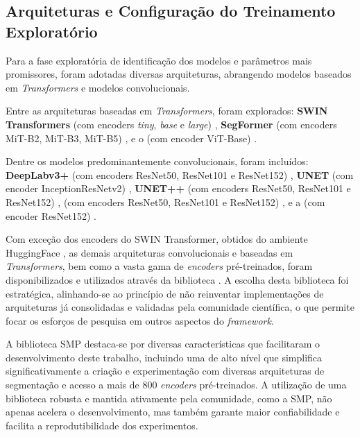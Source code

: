 \subsection{Arquiteturas e Configuração do Treinamento Exploratório}\label{subsec:met_arq_treino_exp}
Para a fase exploratória de identificação dos modelos e parâmetros mais promissores, foram adotadas diversas arquiteturas, abrangendo modelos baseados em \textit{Transformers} e modelos convolucionais.

Entre as arquiteturas baseadas em \textit{Transformers}, foram explorados: \textbf{SWIN Transformers} (com encoders \textit{tiny}, \textit{base} e \textit{large}) \cite{Liu2021}, \textbf{SegFormer} (com encoders MiT-B2, MiT-B3, MiT-B5) \cite{Xie2021}, e o \textbf{} (com encoder ViT-Base) \cite{Ranftl2021}.

Dentre os modelos predominantemente convolucionais, foram incluídos: \textbf{DeepLabv3+} (com encoders ResNet50, ResNet101 e ResNet152) \cite{Chen2018}, \textbf{UNET} (com encoder InceptionResNetv2) \cite{Ronneberger2015, Szegedy2017}, \textbf{UNET++} (com encoders ResNet50, ResNet101 e ResNet152) \cite{Zhou2018}, \textbf{} (com encoders ResNet50, ResNet101 e ResNet152) \cite{Lin2017}, e a \textbf{} (com encoder ResNet152) \cite{Fan2020}.

Com exceção dos encoders do SWIN Transformer, obtidos do ambiente HuggingFace \cite{HuggingFace}, as demais arquiteturas convolucionais e baseadas em \textit{Transformers}, bem como a vasta gama de \textit{encoders} pré-treinados, foram disponibilizados e utilizados através da biblioteca  \cite{Iakubovskii2019}. A escolha desta biblioteca foi estratégica, alinhando-se ao princípio de não reinventar implementações de arquiteturas já consolidadas e validadas pela comunidade científica, o que permite focar os esforços de pesquisa em outros aspectos do \textit{framework}.

A biblioteca SMP destaca-se por diversas características que facilitaram o desenvolvimento deste trabalho, incluindo uma  de alto nível que simplifica significativamente a criação e experimentação com diversas arquiteturas de segmentação e acesso a mais de 800 \textit{encoders} pré-treinados.
A utilização de uma biblioteca robusta e mantida ativamente pela comunidade, como a SMP, não apenas acelera o desenvolvimento, mas também garante maior confiabilidade e facilita a reprodutibilidade dos experimentos.

